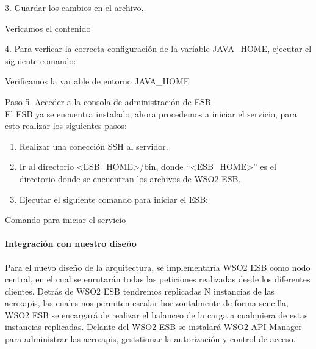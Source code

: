 3. Guardar los cambios en el archivo.

\begin{listing}[H]
  \caption{Vericamos el contenido}
  \label{soa:tecnologias:wso2:bash-cat}
\end{listing}

4. Para verficar la correcta configuración de la variable JAVA\_HOME, ejecutar el siguiente comando:

\begin{listing}[H]
  \caption{Verificamos la variable de entorno JAVA\_HOME}
  \label{soa:tecnologias:wso2:bash-verificar-variable-de-entorno}
\end{listing}

Paso 5. Acceder a la consola de administración de ESB.\\
El ESB ya se encuentra instalado, ahora procedemos a iniciar el servicio, para esto realizar los siguientes pasos:\\

\begin{enumerate}
  \item Realizar una conección SSH al servidor.\\
  \item Ir al directorio <ESB\_HOME>/bin, donde ``<ESB\_HOME>'' es el directorio donde se encuentran los archivos de WSO2 ESB.\\
  \item Ejecutar el siguiente comando para iniciar el ESB:\\
\end{enumerate}

\begin{listing}[H]
  \caption{Comando para iniciar el servicio}
  \label{soa:tecnologias:wso2:bash-inicio-de-servicio}
\end{listing}

\paragraph{Integración con nuestro diseño}

Para el nuevo diseño de la arquitectura, se implementaría WSO2 ESB como nodo central, en el cual se enrutarán todas las peticiones realizadas desde los diferentes clientes.  Detrás de WSO2 ESB tendremos replicadas N instancias de las \glspl{acro:api}, las cuales nos permiten escalar horizontalmente de forma sencilla, WSO2 ESB se encargará de realizar el balanceo de la carga a cualquiera de estas instancias replicadas.  Delante del WSO2 ESB se instalará WSO2 API Manager para administrar las \glspl{acro:api}, geststionar la autorización y control de acceso.

